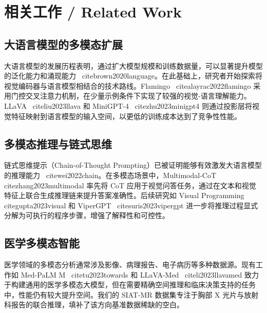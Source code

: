 \section{相关工作 / Related Work}\label{sec:related}

\subsection{大语言模型的多模态扩展}

大语言模型的发展历程表明，通过扩大模型规模和训练数据量，可以显著提升模型的泛化能力和涌现能力~
cite{brown2020language}。在此基础上，研究者开始探索将视觉编码器与语言模型相结合的技术路线。Flamingo~
cite{alayrac2022flamingo} 采用门控交叉注意力机制，在少量示例条件下实现了较强的视觉-语言理解能力。LLaVA~
cite{liu2023llava} 和 MiniGPT-4~
cite{zhu2023minigpt4} 则通过投影层将视觉特征映射到语言模型的输入空间，以更低的训练成本达到了竞争性性能。

\subsection{多模态推理与链式思维}

链式思维提示（Chain-of-Thought Prompting）已被证明能够有效激发大语言模型的推理能力~
cite{wei2022chain}。在多模态场景中，Multimodal-CoT~
cite{zhang2023multimodal} 率先将 CoT 应用于视觉问答任务，通过在文本和视觉特征上联合生成推理链来提升答案准确性。后续研究如 Visual Programming~
cite{gupta2023visual} 和 ViperGPT~
cite{suris2023vipergpt} 进一步将推理过程显式分解为可执行的程序步骤，增强了解释性和可控性。

\subsection{医学多模态智能}

医学领域的多模态分析通常涉及影像、病理报告、电子病历等多种数据源。现有工作如 Med-PaLM M~
cite{tu2023towards} 和 LLaVA-Med~
cite{li2023llavamed} 致力于构建通用的医学多模态大模型，但在需要精确空间推理和临床决策支持的任务中，性能仍有较大提升空间。我们的 SIAT-MR 数据集专注于胸部 X 光片与放射科报告的联合推理，填补了该方向基准数据稀缺的空白。

